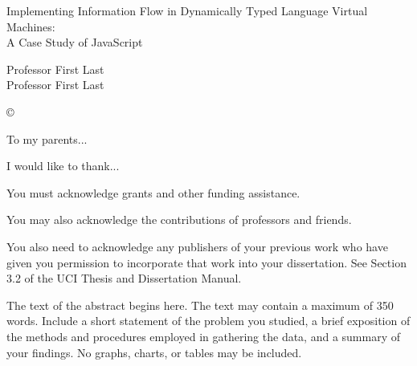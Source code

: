\documentclass[12pt,fleqn]{ucithesis}
\begin{document}
\thesistitle
{
	Implementing Information Flow in Dynamically Typed Language Virtual Machines:\\
	A Case Study of JavaScript
}




\othercommitteemembers
{
	Professor First Last\\
	Professor First Last
}


\copyrightdeclaration
{
	{\copyright} {\Degreeyear} \Authorname
}


\dedications
{
	To my parents...
}

\acknowledgments
{
	I would like to thank...

	You must acknowledge grants and other funding assistance. 

	You may also acknowledge the contributions of professors and friends. 
	
	You also need to acknowledge any publishers of your previous work who have given you permission to incorporate that work into your dissertation. See Section 3.2 of the UCI Thesis and Dissertation Manual.
}



\thesisabstract
{
	The text of the abstract begins here. The text may contain a maximum of 350 words. Include a short statement of the 
problem you studied, a brief exposition of the methods and procedures employed in gathering the data, and a summary of your 
findings. No graphs, charts, or tables may be included.
}
\end{document}
